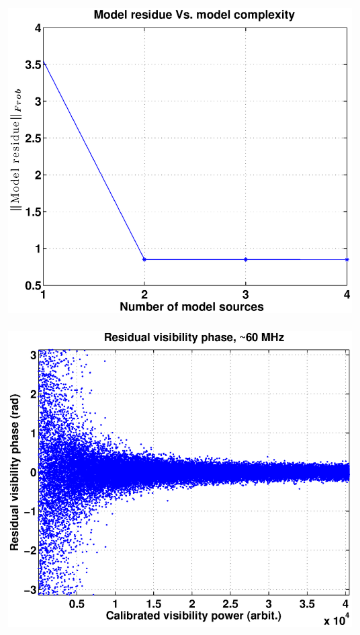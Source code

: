 \documentclass{aa}
\begin{document}
\begin{figure}[tbh]
\begin{subfigure}[b]{\columnwidth}
  \includegraphics[width=\columnwidth]{Figs/model_efficacy.eps}
\end{subfigure}
\begin{subfigure}[b]{\columnwidth}
  \includegraphics[width=\columnwidth]{Figs/selfcal_ph_behaviour_new.eps}
\end{subfigure}


\end{figure}
\end{document}
